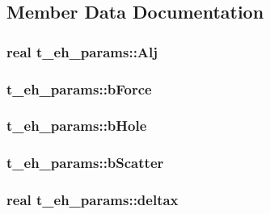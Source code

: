 \subsection{\-Member \-Data \-Documentation}
\hypertarget{structt__eh__params_adbc1ac4d0795a2407f59c250440d53f2}{
\subsubsection[{\-Alj}]{\setlength{\rightskip}{0pt plus 5cm}real {\bf t\-\_\-eh\-\_\-params\-::\-Alj}}}\label{structt__eh__params_adbc1ac4d0795a2407f59c250440d53f2}
\hypertarget{structt__eh__params_adf4411453e3053a4b30784a70517c63c}{
\subsubsection[{b\-Force}]{ {\bf t\-\_\-eh\-\_\-params\-::b\-Force}}}\label{structt__eh__params_adf4411453e3053a4b30784a70517c63c}
\hypertarget{structt__eh__params_ade68f2b0f7e625d4c3adb487dafb5c8c}{
\subsubsection[{b\-Hole}]{ {\bf t\-\_\-eh\-\_\-params\-::b\-Hole}}}\label{structt__eh__params_ade68f2b0f7e625d4c3adb487dafb5c8c}
\hypertarget{structt__eh__params_a23fb5a49f41ca4cedf01f1ed322cee1e}{
\subsubsection[{b\-Scatter}]{ {\bf t\-\_\-eh\-\_\-params\-::b\-Scatter}}}\label{structt__eh__params_a23fb5a49f41ca4cedf01f1ed322cee1e}
\hypertarget{structt__eh__params_af004e1bc99a04ba0f8ff2ab4598dfd6d}{
\subsubsection[{deltax}]{\setlength{\rightskip}{0pt plus 5cm}real {\bf t\-\_\-eh\-\_\-params\-::deltax}}}\label{structt__eh__params_af004e1bc99a04ba0f8ff2ab4598dfd6d}
